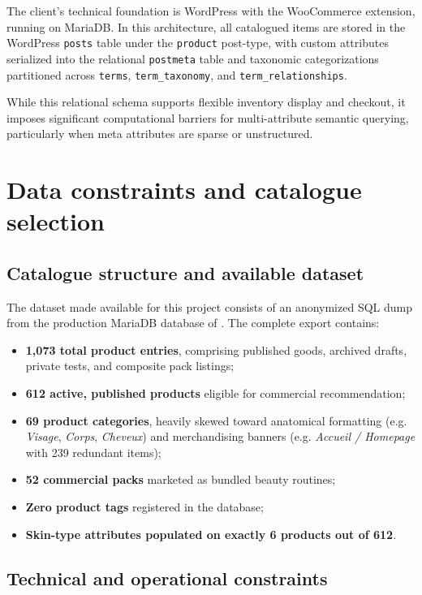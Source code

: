 The client's technical foundation is WordPress with the WooCommerce extension, running on MariaDB. In this architecture, all catalogued items are stored in the WordPress \texttt{posts} table under the \texttt{product} post-type, with custom attributes serialized into the relational \texttt{postmeta} table and taxonomic categorizations partitioned across \texttt{terms}, \texttt{term\_taxonomy}, and \texttt{term\_relationships}.

While this relational schema supports flexible inventory display and checkout, it imposes significant computational barriers for multi-attribute semantic querying, particularly when meta attributes are sparse or unstructured.

\section{Data constraints and catalogue selection}

\subsection{Catalogue structure and available dataset}

The dataset made available for this project consists of an anonymized SQL dump from the production MariaDB database of \clientsite. The complete export contains:
\begin{itemize}
  \item \textbf{1{,}073 total product entries}, comprising published goods, archived drafts, private tests, and composite pack listings;
  \item \textbf{612 active, published products} eligible for commercial recommendation;
  \item \textbf{69 product categories}, heavily skewed toward anatomical formatting (e.g. \emph{Visage}, \emph{Corps}, \emph{Cheveux}) and merchandising banners (e.g. \emph{Accueil / Homepage} with 239 redundant items);
  \item \textbf{52 commercial packs} marketed as bundled beauty routines;
  \item \textbf{Zero product tags} registered in the database;
  \item \textbf{Skin-type attributes populated on exactly 6 products out of 612}.
\end{itemize}

\subsection{Technical and operational constraints}

